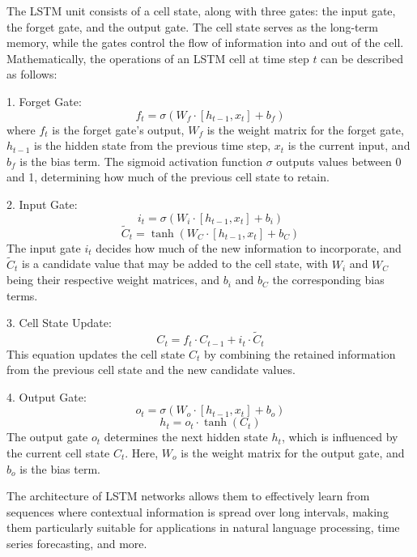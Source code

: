 \documentclass[a4paper,12pt]{article}
\begin{document}
The LSTM unit consists of a cell state, along with three gates: the input gate, the forget gate, and the output gate. The cell state serves as the long-term memory, while the gates control the flow of information into and out of the cell. Mathematically, the operations of an LSTM cell at time step \(t\) can be described as follows:

1. Forget Gate:
\begin{equation}
f_t = \sigma(W_f \cdot [h_{t-1}, x_t] + b_f)
\end{equation}
where \(f_t\) is the forget gate's output, \(W_f\) is the weight matrix for the forget gate, \(h_{t-1}\) is the hidden state from the previous time step, \(x_t\) is the current input, and \(b_f\) is the bias term. The sigmoid activation function \(\sigma\) outputs values between 0 and 1, determining how much of the previous cell state to retain.

2. Input Gate:
\begin{equation}
i_t = \sigma(W_i \cdot [h_{t-1}, x_t] + b_i)
\end{equation}
\begin{equation}
\tilde{C}_t = \tanh(W_C \cdot [h_{t-1}, x_t] + b_C)
\end{equation}
The input gate \(i_t\) decides how much of the new information to incorporate, and \(\tilde{C}_t\) is a candidate value that may be added to the cell state, with \(W_i\) and \(W_C\) being their respective weight matrices, and \(b_i\) and \(b_C\) the corresponding bias terms.

3. Cell State Update:
\begin{equation}
C_t = f_t \cdot C_{t-1} + i_t \cdot \tilde{C}_t
\end{equation}
This equation updates the cell state \(C_t\) by combining the retained information from the previous cell state and the new candidate values.

4. Output Gate:
\begin{equation}
o_t = \sigma(W_o \cdot [h_{t-1}, x_t] + b_o)
\end{equation}
\begin{equation}
h_t = o_t \cdot \tanh(C_t)
\end{equation}
The output gate \(o_t\) determines the next hidden state \(h_t\), which is influenced by the current cell state \(C_t\). Here, \(W_o\) is the weight matrix for the output gate, and \(b_o\) is the bias term.

The architecture of LSTM networks allows them to effectively learn from sequences where contextual information is spread over long intervals, making them particularly suitable for applications in natural language processing, time series forecasting, and more.
\end{document}

